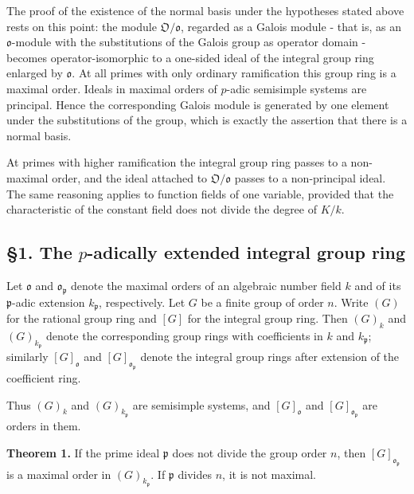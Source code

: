 \documentclass[
  11pt,
]{article}
\begin{document}
The proof of the existence of the normal basis under the hypotheses
stated above rests on this point: the module
\(\mathfrak O/\mathfrak o\), regarded as a Galois module - that is, as
an \(\mathfrak o\)-module with the substitutions of the Galois group as
operator domain - becomes operator-isomorphic to a one-sided ideal of
the integral group ring enlarged by \(\mathfrak o\). At all primes with
only ordinary ramification this group ring is a maximal order. Ideals in
maximal orders of \(p\)-adic semisimple systems are principal. Hence the
corresponding Galois module is generated by one element under the
substitutions of the group, which is exactly the assertion that there is
a normal basis.

At primes with higher ramification the integral group ring passes to a
non-maximal order, and the ideal attached to \(\mathfrak O/\mathfrak o\)
passes to a non-principal ideal. The same reasoning applies to function
fields of one variable, provided that the characteristic of the constant
field does not divide the degree of \(K/k\).

\subsection{\texorpdfstring{§1. The \(p\)-adically extended integral
group
ring}{§1. The p-adically extended integral group ring}}\label{the-p-adically-extended-integral-group-ring}

Let \(\mathfrak o\) and \(\mathfrak o_{\mathfrak p}\) denote the maximal
orders of an algebraic number field \(k\) and of its
\(\mathfrak p\)-adic extension \(k_{\mathfrak p}\), respectively. Let
\(G\) be a finite group of order \(n\). Write \((G)\) for the rational
group ring and \([G]\) for the integral group ring. Then \((G)_k\) and
\((G)_{k_{\mathfrak p}}\) denote the corresponding group rings with
coefficients in \(k\) and \(k_{\mathfrak p}\); similarly
\([G]_{\mathfrak o}\) and \([G]_{\mathfrak o_{\mathfrak p}}\) denote the
integral group rings after extension of the coefficient ring.

Thus \((G)_k\) and \((G)_{k_{\mathfrak p}}\) are semisimple systems, and
\([G]_{\mathfrak o}\) and \([G]_{\mathfrak o_{\mathfrak p}}\) are orders
in them.

\textbf{Theorem 1.} If the prime ideal \(\mathfrak p\) does not divide
the group order \(n\), then \([G]_{\mathfrak o_{\mathfrak p}}\) is a
maximal order in \((G)_{k_{\mathfrak p}}\). If \(\mathfrak p\) divides
\(n\), it is not maximal.
\end{document}
